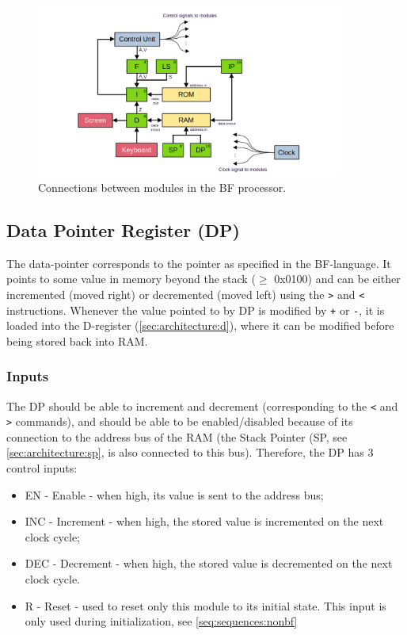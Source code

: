 \begin{figure}[H]
  \centering
  \includegraphics[width=0.9\textwidth]{img/bfcpu_architecture}
  \caption{Connections between modules in the BF processor.}
  \label{fig:architecture}
\end{figure}


\subsection{Data Pointer Register (DP)} \label{sec:architecture:dp}
The data-pointer corresponds to the pointer as specified in the BF-language. It points to some value in memory beyond the stack ($\ge$ 0x0100) and can be either incremented (moved right) or decremented (moved left) using the \texttt{>} and \texttt{<} instructions. Whenever the value pointed to by DP is modified by \texttt{+} or \texttt{-}, it is loaded into the D-register (\ref{sec:architecture:d}), where it can be modified before being stored back into RAM.

\subsubsection*{Inputs}
The DP should be able to increment and decrement (corresponding to the \texttt{<} and \texttt{>} commands), and should be able to be enabled/disabled because of its connection to the address bus of the RAM (the Stack Pointer (SP, see \ref{sec:architecture:sp}, is also connected to this bus). Therefore, the DP has 3 control inputs:
\begin{itemize}
\item EN - Enable - when high, its value is sent to the address bus;
\item INC - Increment - when high, the stored value is incremented on the next clock cycle;
\item DEC - Decrement - when high, the stored value is decremented on the next clock cycle.
\item R - Reset - used to reset only this module to its initial state. This input is only used during initialization, see \ref{seq:sequences:nonbf}
\end{itemize}

